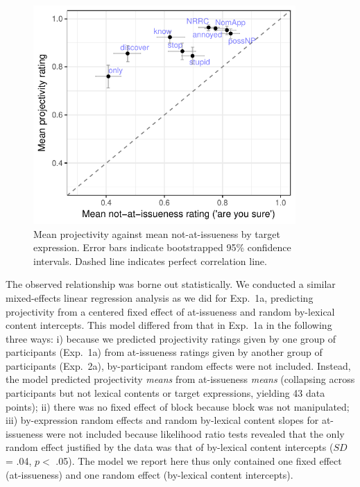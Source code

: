 \documentclass[11pt,fleqn]{article}
\newcommand{\6}{\mbox{$[\hspace*{-.6mm}[$}}
\newcommand{\9}{\mbox{$]\hspace*{-.6mm}]$}}
\begin{document}
\begin{figure}[!h]

\begin{center}
\includegraphics[width=10cm]{../results/exp2a/graphs/ai-proj-bytrigger-labels}
\end{center}

\caption{Mean projectivity against mean not-at-issueness by target expression. Error bars indicate bootstrapped 95\% confidence intervals. Dashed line indicates perfect correlation line.}
\label{fig:f-proj-ai-2a}
\end{figure}


The observed relationship was borne out statistically. We conducted a similar mixed-effects linear regression analysis as we did for Exp.~1a, predicting projectivity from a centered fixed effect of at-issueness and random by-lexical content intercepts. This model differed from that in Exp.~1a in the following three ways: i) because we predicted projectivity ratings given by one group of participants (Exp.~1a) from at-issueness ratings given by another group of participants (Exp.~2a), by-participant random effects were not included. Instead, the model predicted projectivity \emph{means}  from  at-issueness \emph{means} (collapsing across participants but not lexical contents or target expressions, yielding 43 data points); ii) there was no fixed effect of block because block was not manipulated; iii) by-expression random effects and random by-lexical content slopes for at-issueness were not included because likelihood ratio tests revealed that the only random effect justified by the data was that of by-lexical content intercepts ($SD$ = .04, $p < $ .05). The model we report here thus only contained one fixed effect (at-issueness) and one random effect (by-lexical content intercepts).
\end{document}
